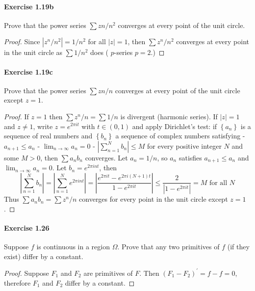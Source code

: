 \documentclass{article}
\begin{document}
\paragraph{Exercise 1.19b} Prove that the power series $\sum zn/n^2$ converges at every point of the unit circle.
\begin{proof}
    Since $\left|z^n / n^2\right|=1 / n^2$ for all $|z|=1$, then $\sum z^n / n^2$ converges at every point in the unit circle as $\sum 1 / n^2$ does ( $p$-series $p=2$.)
\end{proof}



\paragraph{Exercise 1.19c} Prove that the power series $\sum zn/n$ converges at every point of the unit circle except $z = 1$.
\begin{proof}
    If $z=1$ then $\sum z^n / n=\sum 1 / n$ is divergent (harmonic series). If $|z|=1$ and $z \neq 1$, write $z=e^{2 \pi i t}$ with $t \in(0,1)$ and apply Dirichlet's test: if $\left\{a_n\right\}$ is a sequence of real numbers and $\left\{b_n\right\}$ a sequence of complex numbers satisfying
- $a_{n+1} \leq a_n$
- $\lim _{n \rightarrow \infty} a_n=0$
- $\left|\sum_{n=1}^N b_n\right| \leq M$ for every positive integer $N$ and some $M>0$,
then $\sum a_n b_n$ converges. Let $a_n=1 / n$, so $a_n$ satisfies $a_{n+1} \leq a_n$ and $\lim _{n \rightarrow \infty} a_n=0$. Let $b_n=e^{2 \pi i n t}$, then
$$
\left|\sum_{n=1}^N b_n\right|=\left|\sum_{n=1}^N e^{2 \pi i n t}\right|=\left|\frac{e^{2 \pi i t}-e^{2 \pi i(N+1) t}}{1-e^{2 \pi i t}}\right| \leq \frac{2}{\left|1-e^{2 \pi i t}\right|}=M \text { for all } N
$$
Thus $\sum a_n b_n=\sum z^n / n$ converges for every point in the unit circle except $z=1$.
\end{proof}


\paragraph{Exercise 1.26} Suppose $f$ is continuous in a region $\Omega$. Prove that any two primitives of $f$ (if they exist) differ by a constant.
\begin{proof}
    Suppose $F_1$ and $F_2$ are primitives of $F$. Then $(F_1-F_2)^\prime = f - f = 0$, therefore $F_1$ and $F_2$ differ by a constant. 
\end{proof}
\end{document}
